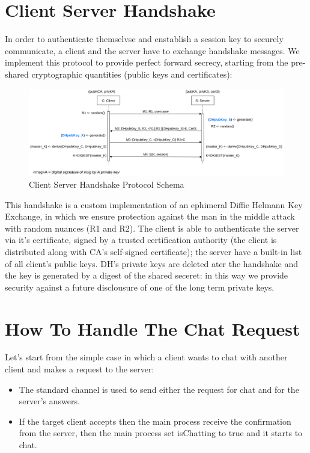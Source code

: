 \documentclass[11pt]{report}
\begin{document}
\section{Client Server Handshake}
In order to authenticate themselvse and enstablish a session key to securely communicate, a client
and the server have to exchange handshake messages. We implement this protocol to provide perfect 
forward secrecy, starting from the pre-shared cryptographic quantities (public keys and certificates):
\begin{figure}[H]
	\centering
	\includegraphics[scale=0.4]{img/AuthClientServer.png}
	\caption{Client Server Handshake Protocol Schema}
	\label {img: AuthClientServer}
\end{figure}
This handshake is a custom implementation of an ephimeral Diffie Helmann Key Exchange, in which we ensure
protection against the man in the middle attack with random nuances (R1 and R2). The client is able to 
authenticate the server via it's certificate, signed by a trusted certification authority (the client
is distributed along with CA's self-signed certificate); the server have a built-in list of all client's
public keys. DH's private keys are deleted ater the handshake and the key is generated by a digest of the 
shared seceret: in this way we provide security against a future disclousure of one of the long term private keys.


\newpage
\section{How To Handle The Chat Request}
\noindent Let's start from the simple case in which a client wants to chat with another client and makes a request to the server: 
\begin{itemize}
	\item The standard channel is used to send either the request for chat and for the server's answers.
	\item If the target client accepts then the main process receive the confirmation from the server, then the main process set isChatting to true and it starts to chat.
\end{itemize}
\end{document}
